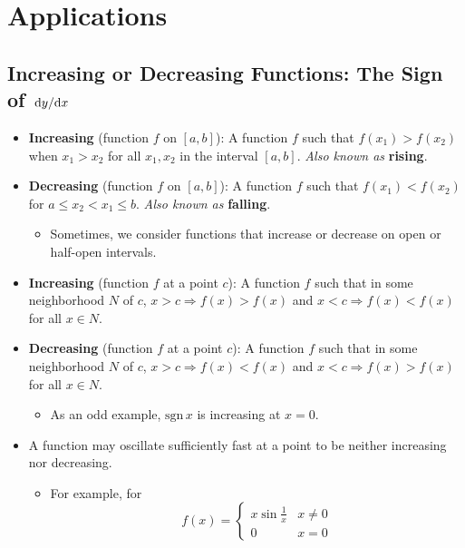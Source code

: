 \documentclass[../main.tex]{subfiles}
\begin{document}
\chapter{Applications}
\section{Increasing or Decreasing Functions: The Sign of \texorpdfstring{$\dv*{y}{x}$}{TEXT}}
\begin{itemize}
    \item {}\textbf{Increasing} (function $f$ on $[a,b]$): A function $f$ such that $f(x_1)>f(x_2)$ when $x_1>x_2$ for all $x_1,x_2$ in the interval $[a,b]$. \emph{Also known as} \textbf{rising}.
    \item \textbf{Decreasing} (function $f$ on $[a,b]$): A function $f$ such that $f(x_1)<f(x_2)$ for $a\leq x_2<x_1\leq b$. \emph{Also known as} \textbf{falling}.
    \begin{itemize}
        \item Sometimes, we consider functions that increase or decrease on open or half-open intervals.
    \end{itemize}
    \item \textbf{Increasing} (function $f$ at a point $c$): A function $f$ such that in some neighborhood $N$ of $c$, $x>c \Rightarrow f(x)>f(x)$ and $x<c \Rightarrow f(x)<f(x)$ for all $x\in N$.
    \item \textbf{Decreasing} (function $f$ at a point $c$): A function $f$ such that in some neighborhood $N$ of $c$, $x>c \Rightarrow f(x)<f(x)$ and $x<c \Rightarrow f(x)>f(x)$ for all $x\in N$.
    \begin{itemize}
        \item As an odd example, $\text{sgn}\, x$ is increasing at $x=0$.
    \end{itemize}
    \item A function may oscillate sufficiently fast at a point to be neither increasing nor decreasing.
    \begin{itemize}
        \item For example, for
        \begin{equation*}
            f(x) =
            \begin{cases}
                x\sin\frac{1}{x} & x\neq 0\\
                0 & x=0
            \end{cases}
        \end{equation*}

\end{itemize}
\end{itemize}
\end{document}

